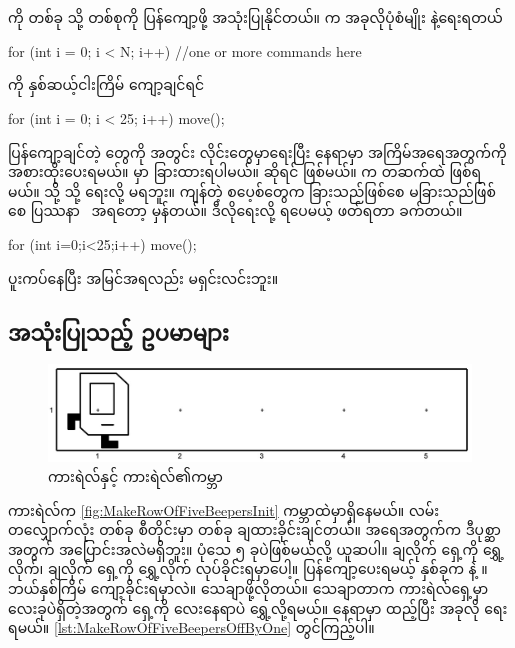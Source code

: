 \begin{sloppypar}
\section{{} }
  ကို \mmcommand တစ်ခု သို့ တစ်စုကို ပြန်ကျော့ဖို့ အသုံးပြုနိုင်တယ်။ \mmsyntax က အခုလိုပုံစံမျိုး နဲ့ရေးရတယ်  
\begin{lstcodeminimal}
for (int i = 0; i < N; i++) {
    //one or more commands here
}
\end{lstcodeminimal}
 ကို နှစ်ဆယ့်ငါးကြိမ် ကျော့ချင်ရင် 
\begin{lstcodeminimal}[]
for (int i = 0; i < 25; i++) {
    move();
}
\end{lstcodeminimal}
ပြန်ကျော့ချင်တဲ့ \mmcommand တွေကို \mmcurlybrpair အတွင်း လိုင်းတွေမှာရေးပြီး  နေရာမှာ အကြိမ်အရေအတွက်ကို အစားထိုးပေးရမယ်။  မှာ ခြားထားရပါမယ်။  ဆိုရင် \mmsyntaxerr ဖြစ်မယ်။  က တဆက်ထဲ ဖြစ်ရမယ်။  သို့  သို့  ရေးလို့ မရဘူး။ ကျန်တဲ့ စပေ့စ်တွေက ခြားသည်ဖြစ်စေ မခြားသည်ဖြစ်စေ ပြဿနာ \mmsyntax\ အရတော့ မှန်တယ်။ ဒီလိုရေးလို့ ရပေမယ့် ဖတ်ရတာ ခက်တယ်။ 
\begin{lstcodeminimal}[]
for (int i=0;i<25;i++){
move();
}
\end{lstcodeminimal}
\noindent ပူးကပ်နေပြီး အမြင်အရလည်း မရှင်းလင်းဘူး။

\subsection{  အသုံးပြုသည့် ဥပမာများ}
\begin{figure}[htb]
    \caption{ကားရဲလ်နှင့်  ကားရဲလ်၏ကမ္ဘာ}\label{fig:MakeRowOfFiveBeepersInit}
    \includegraphics[scale=0.2, left]{ch02/MakeRowOfFiveBeepers/init.jpg}
\end{figure}
ကားရဲလ်က \Fig \vref*{fig:MakeRowOfFiveBeepersInit} ကမ္ဘာထဲမှာရှိနေမယ်။ လမ်းတလျှောက်လုံး \mmcorner တစ်ခု စီတိုင်းမှာ \mmbeeper တစ်ခု ချထားခိုင်းချင်တယ်။ \mmavenue အရေအတွက်က ဒီပုစ္ဆာအတွက် အပြောင်းအလဲမရှိဘူး။ ပုံသေ ၅ ခုပဲဖြစ်မယ်လို့ ယူဆပါ။ \mmbeeper ချလိုက် ရှေ့\mmcorner ကို ရွှေ့လိုက်၊ \mmbeeper ချလိုက် ရှေ့\mmcorner ကို ရွှေ့လိုက် လုပ်ခိုင်းရမှာပေါ့။  ပြန်ကျော့ပေးရမယ့် \mmcommand နှစ်ခုက  နဲ့ ။ ဘယ်နှစ်ကြိမ် ကျော့ခိုင်းရမှာလဲ။ သေချာဖို့လိုတယ်။ သေချာတာက ကားရဲလ်ရှေ့မှာ \mmcorner လေးခုပဲရှိတဲ့အတွက် ရှေ့ကို လေးနေရာပဲ ရွှေ့လို့ရမယ်။  နေရာမှာ  ထည့်ပြီး အခုလို ရေးရမယ်။ \Lst \vref*{lst:MakeRowOfFiveBeepersOffByOne} တွင်ကြည့်ပါ။


\end{sloppypar}
